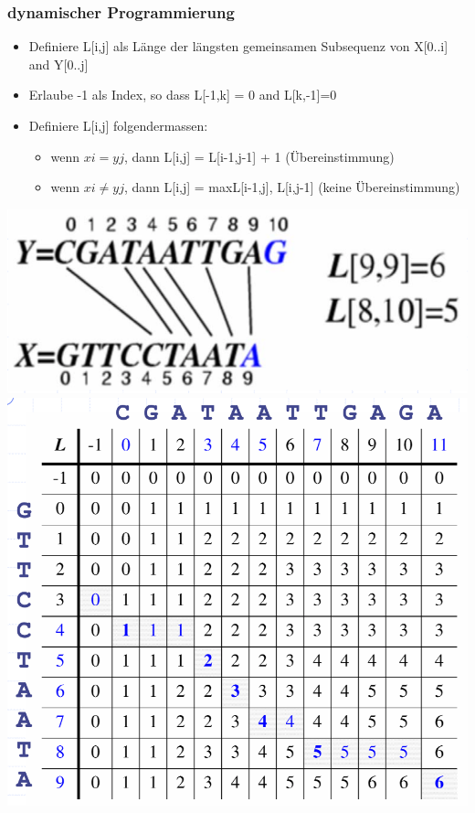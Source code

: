 \subsubsection{dynamischer Programmierung}
\begin{itemize}
    \item Definiere L[i,j] als Länge der längsten gemeinsamen Subsequenz von X[0..i] and Y[0..j]
    \item Erlaube -1 als Index, so dass L[-1,k] = 0 and L[k,-1]=0
    \item Definiere L[i,j] folgendermassen:
    \begin{itemize}
        \item wenn $xi = yj$, dann L[i,j] = L[i-1,j-1] + 1 (Übereinstimmung)
        \item wenn $xi \neq yj$, dann L[i,j] = max{L[i-1,j], L[i,j-1]} (keine Übereinstimmung)
    \end{itemize}
\end{itemize}
\vspace{-8pt}
\begin{center}
    \includegraphics[scale=.2]{graphic/10 DynamicProgramming/Versuch mit dynamischer Programmierung.png}
    \includegraphics[scale=.2]{graphic/10 DynamicProgramming/Versuch mit dynamischer Programmierung2.png}
\end{center}
\vspace{-8pt}

